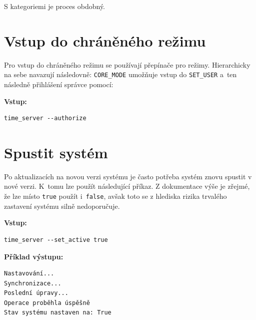 \documentclass[11pt,a4paper]{book}
\begin{document}
S kategoriemi je proces obdobný.

\section{Vstup do chráněného režimu}
Pro vstup do chráněného režimu se používají přepínače pro režimy. Hierarchicky na sebe navazují následovně: \texttt{CORE\_MODE} umožňuje vstup do \texttt{SET\_USER} a~ten následně přihlášení správce pomocí:

\textbf{Vstup:}
\begin{verbatim}
time_server --authorize
\end{verbatim}

\section{Spustit systém}
Po aktualizacích na novou verzi systému je často potřeba systém znovu spustit v nové verzi. K~tomu lze použít následující příkaz. Z dokumentace výše je zřejmé, že lze místo \texttt{true} použít i~\texttt{false}, avšak toto se z hlediska rizika trvalého zastavení systému silně nedoporučuje.

\textbf{Vstup:}
\begin{verbatim}
time_server --set_active true
\end{verbatim}

\textbf{Příklad výstupu:}
\begin{verbatim}
Nastavování...
Synchronizace...
Poslední úpravy...
Operace proběhla úspěšně
Stav systému nastaven na: True
\end{verbatim}

\backmatter
\printindex
\end{document}
